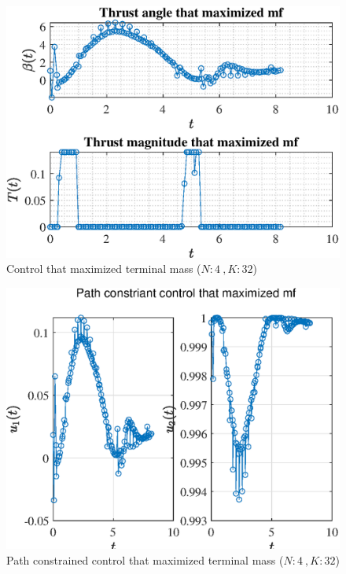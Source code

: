 \documentclass[]{article}
\begin{document}
	\begin{figure}
		\centering
		\includegraphics[scale=0.75]{control_N4_K32_C3_mf.eps}
		\caption{Control that maximized terminal mass (\(N:4\ , K:32\))}
		\label{fig:control_N4_K32_C3_mf}
	\end{figure}
	\begin{figure}
		\centering
		\includegraphics[scale=0.75]{path_N4_K32_C3_mf.eps}
		\caption{Path constrained control that maximized terminal mass (\(N:4\ , K:32\))}
		\label{fig:path_N4_K32_C3_mf}
	\end{figure}
\end{document}
